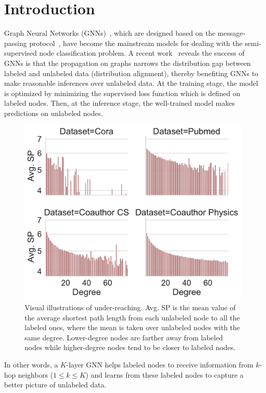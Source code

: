 \documentclass[letterpaper]{article} %
\begin{document}
\section{Introduction}
Graph Neural Networks (GNNs)~\cite{gcn, gat, sgc, gcnii, appnp, sage}, which are designed based on the message-passing protocol~\cite{mpnn}, have become the mainstream models for dealing with the semi-supervised node classification problem. A recent work~\cite{distribution} reveals the success of GNNs is that the propagation on graphs narrows the distribution gap between labeled and unlabeled data (distribution alignment), thereby benefiting GNNs to make reasonable inferences over unlabeled data. At the training stage, the model is optimized by minimizing the supervised loss function which is defined on labeled nodes. Then, at the inference stage, the well-trained model makes predictions on unlabeled nodes.
\begin{figure}[!htbp]
        \centering
       \includegraphics[width=0.85\columnwidth]{figs/Avg_SP_Distribution.pdf}
        \caption{Visual illustrations of under-reaching. Avg. SP is the mean value of the average shortest path length from each unlabeled node to all the labeled ones, where the mean is taken over unlabeled nodes with the same degree. Lower-degree nodes are farther away from labeled nodes while higher-degree nodes tend to be closer to labeled nodes.}
        \label{fig:under-reaching}
\end{figure}
In other words, a $K$-layer GNN helps labeled nodes to receive information from $k$-hop neighbors ($1 \leq k \leq K$) and learns from these labeled nodes to capture a better picture of unlabeled data.
\end{document}
